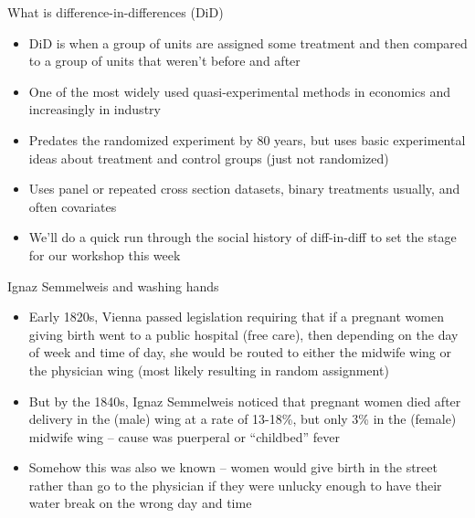 \documentclass{beamer}
\begin{document}
\begin{frame}{What is difference-in-differences (DiD)}

\begin{itemize}
\item DiD is when a group of units are assigned some treatment and then compared to a group of units that weren't before and after
\item One of the most widely used quasi-experimental methods in economics and increasingly in industry
\item Predates the randomized experiment by 80 years, but uses basic experimental ideas about treatment and control groups (just not randomized)
\item Uses panel or repeated cross section datasets, binary treatments usually, and often covariates
\item We'll do a quick run through the social history of diff-in-diff to set the stage for our workshop this week
\end{itemize}
\end{frame}








\begin{frame}{Ignaz Semmelweis and washing hands}

\begin{itemize}
\item Early 1820s, Vienna passed legislation requiring that if a pregnant women giving birth went to a public hospital (free care), then depending on the day of week and time of day, she would be routed to either the midwife wing or the physician wing (most likely resulting in random assignment)
\item But by the 1840s, Ignaz Semmelweis noticed that pregnant women died after delivery in the (male) wing at a rate of 13-18\%, but only 3\% in the (female) midwife wing -- cause was puerperal or “childbed” fever
\item Somehow this was also we known -- women would give birth in the street rather than go to the physician if they were unlucky enough to have their water break on the wrong day and time
\end{itemize}

\end{frame}
\end{document}
